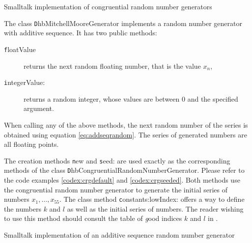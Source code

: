 \begin{listing} Smalltalk implementation of congruential random number generators
\label{ls:randomcong}

\end{listing}

\noindent The class {\texttt DhbMitchellMooreGenerator} implements a
random number generator with additive sequence. It has two public
methods:
\begin{description}
  \item[\texttt floatValue] returns the next random floating number,
  that is the value $x_n$,
  \item[\texttt integerValue:] returns a random integer, whose values
  are between 0 and the specified argument.
\end{description}
When calling any of the above methods, the next random number of
the series is obtained using equation \ref{eq:addseqrandom}. The
series of generated numbers are all floating points.

The creation methods {\texttt new} and {\texttt seed:} are used exactly as
the corresponding methods of the class {\texttt
DhbCongruentialRandomNumberGenerator}. Please refer to the code
examples \ref{codex:crgdefault} and \ref{codex:crgseeded}. Both
methods use the congruential random number generator to generate
the initial series of numbers $x_1,\ldots,x_{55}$. The class
method {\texttt constants:lowIndex:} offers a way to define the
numbers $k$ and $l$ as well as the initial series of numbers. The
reader wishing to use this method should consult the table of {\textsl
good} indices $k$ and $l$ in \cite{Knuth2}.

\begin{listing} Smalltalk implementation of an additive sequence random number generator
\label{ls:randomseq}

\end{listing}

